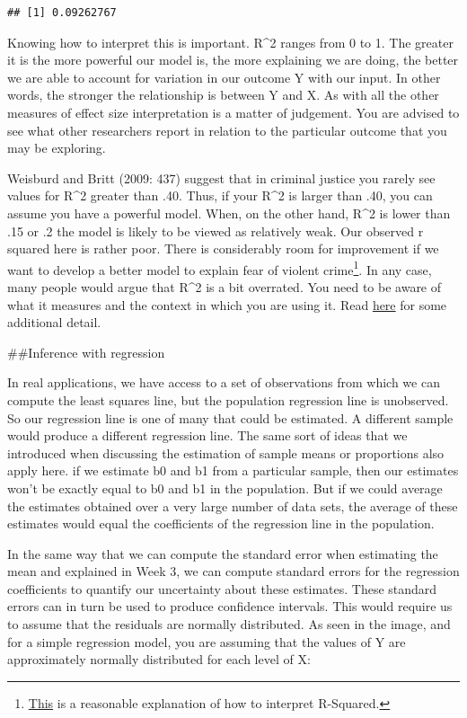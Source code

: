 \documentclass[]{book}
\let\rmarkdownfootnote\footnote%
\def\footnote{\protect\rmarkdownfootnote}
\theoremstyle{definition}
\theoremstyle{definition}
\theoremstyle{definition}
\theoremstyle{remark}
\begin{document}
\begin{verbatim}
## [1] 0.09262767
\end{verbatim}

Knowing how to interpret this is important. R\^{}2 ranges from 0 to 1.
The greater it is the more powerful our model is, the more explaining we
are doing, the better we are able to account for variation in our
outcome Y with our input. In other words, the stronger the relationship
is between Y and X. As with all the other measures of effect size
interpretation is a matter of judgement. You are advised to see what
other researchers report in relation to the particular outcome that you
may be exploring.

Weisburd and Britt (2009: 437) suggest that in criminal justice you
rarely see values for R\^{}2 greater than .40. Thus, if your R\^{}2 is
larger than .40, you can assume you have a powerful model. When, on the
other hand, R\^{}2 is lower than .15 or .2 the model is likely to be
viewed as relatively weak. Our observed r squared here is rather poor.
There is considerably room for improvement if we want to develop a
better model to explain fear of violent crime\footnote{\href{http://blog.minitab.com/blog/adventures-in-statistics/regression-analysis-how-do-i-interpret-r-squared-and-assess-the-goodness-of-fit}{This}
  is a reasonable explanation of how to interpret R-Squared.}. In any
case, many people would argue that R\^{}2 is a bit overrated. You need
to be aware of what it measures and the context in which you are using
it. Read
\href{http://blog.minitab.com/blog/adventures-in-statistics/how-high-should-r-squared-be-in-regression-analysis}{here}
for some additional detail.

\#\#Inference with regression

In real applications, we have access to a set of observations from which
we can compute the least squares line, but the population regression
line is unobserved. So our regression line is one of many that could be
estimated. A different sample would produce a different regression line.
The same sort of ideas that we introduced when discussing the estimation
of sample means or proportions also apply here. if we estimate b0 and b1
from a particular sample, then our estimates won't be exactly equal to
b0 and b1 in the population. But if we could average the estimates
obtained over a very large number of data sets, the average of these
estimates would equal the coefficients of the regression line in the
population.

In the same way that we can compute the standard error when estimating
the mean and explained in Week 3, we can compute standard errors for the
regression coefficients to quantify our uncertainty about these
estimates. These standard errors can in turn be used to produce
confidence intervals. This would require us to assume that the residuals
are normally distributed. As seen in the image, and for a simple
regression model, you are assuming that the values of Y are
approximately normally distributed for each level of X:
\end{document}
